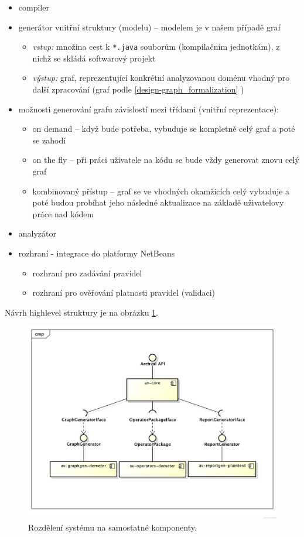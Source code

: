 \begin{itemize}
\item compiler
\item generátor vnitřní struktury (modelu) -- modelem je v našem případě graf
  \begin{itemize}
  \item \emph{vstup:} množina cest k \verb+*.java+ souborům (kompilačním jednotkám), z nichž se skládá softwarový projekt
  \item \emph{výstup:} graf, reprezentující konkrétní analyzovanou doménu vhodný pro další zpracování (graf podle \ref{design-graph_formalization} )
  \end{itemize}
\item možnosti generování grafu závislostí mezi třídami (vnitřní reprezentace):
  \begin{itemize}
  \item on demand -- když bude potřeba, vybuduje se kompletně celý graf a poté se zahodí
  \item on the fly -- při práci uživatele na kódu se bude vždy generovat znovu celý graf
  \item kombinovaný přístup -- graf se ve vhodných okamžicích celý vybuduje a poté budou probíhat jeho následné aktualizace na základě uživatelovy práce nad kódem
  \end{itemize}
\item analyzátor
\item rozhraní - integrace do platformy NetBeans
  \begin{itemize}
  \item rozhraní pro zadávání pravidel
  \item rozhraní pro ověřování platnosti pravidel (validaci)
  \end{itemize}
\end{itemize}

Návrh highlevel struktury je na obrázku \ref{design-modules}.

\begin{figure}[h!]
  \centering
  \includegraphics[width=1.0\textwidth]{./uml/archval_module_cmp.png}
  \caption{Rozdělení systému na samostatné komponenty.\label{design-modules}}
\end{figure}

